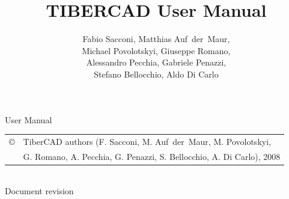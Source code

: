 \documentclass[12pt,            %
               a4paper,         %
               twoside,         %
               pdftex
               ]{book}
\newcommand{\TiberCAD}{{{T{\scriptsize IBER}CAD}}}
\newcommand{\clear}{\newpage}
\newcommand{\clear}{\newpage{\pagestyle{empty}\cleardoublepage}}
\theoremstyle{plain}
\begin{document}
\ifpdf
\else
\fi



\title{T{\large IBER}CAD User Manual}
\author{Fabio Sacconi, Matthias Auf~der~Maur, \\ Michael Povolotskyi, Giuseppe Romano, \\ Alessandro Pecchia, Gabriele Penazzi, \\
Stefano  Bellocchio,  Aldo Di Carlo} 
\maketitle


\thispagestyle{empty}
\vspace*{\textheight}
\vspace{-3cm}
\noindent\TiberCAD{} User Manual \smallskip \smallskip \\
\begin{tabular}{@{}l@{ }l}
\copyright & TiberCAD authors (F. Sacconi, M. Auf~der~Maur, M. Povolotskyi, \\
 & G. Romano, A. Pecchia, G. Penazzi, S. Bellocchio, A. Di Carlo), 2008
\end{tabular} \smallskip \smallskip \\
Document revision 


\clear
\setcounter{page}{1}

\ifpdf{}\fi
{}
\tableofcontents

\clear

                             

\clear
{}

\clear

\clear

\clear

\clear

\clear

\clear

\clear

\clear

\clear



\ifpdf{}\fi
{}


\end{document}
